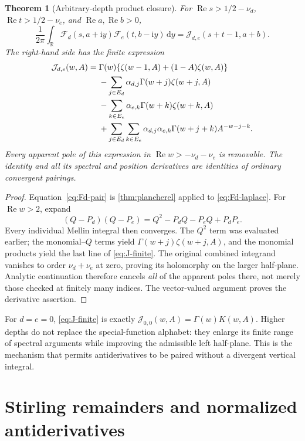 \documentclass[11pt,a4paper]{article}
\newtheorem{theorem}{Theorem}[section]
\theoremstyle{definition}
\numberwithin{equation}{section}
\newcommand{\R}{\mathbb R}
\newcommand{\Rea}{\operatorname{Re}}
\newcommand{\dd}{\,\mathrm d}
\newcommand{\ii}{\mathrm i}
\begin{document}
\begin{theorem}[Arbitrary-depth product closure]\label{thm:depth-closure}
For $\Rea s>1/2-\nu_d$, $\Rea t>1/2-\nu_e$, and
$\Rea a,\Rea b>0$,
\begin{equation}\label{eq:Fd-pair}
 \frac1{2\pi}\int_{\R}\mathcal F_d(s,a+\ii y)
                         \mathcal F_e(t,b-\ii y)\dd y
       =\mathcal J_{d,e}(s+t-1,a+b).
\end{equation}
The right-hand side has the finite expression
\begin{align}
 \mathcal J_{d,e}(w,A)={}&
 \Gamma(w)\{\zeta(w-1,A)+(1-A)\zeta(w,A)\}\notag\\
 &-\sum_{j\in E_d}\alpha_{d,j}\Gamma(w+j)\zeta(w+j,A)\notag\\
 &-\sum_{k\in E_e}\alpha_{e,k}\Gamma(w+k)\zeta(w+k,A)\notag\\
 &+\sum_{j\in E_d}\sum_{k\in E_e}
   \alpha_{d,j}\alpha_{e,k}\Gamma(w+j+k)A^{-w-j-k}.
                  \label{eq:J-finite}
\end{align}
Every apparent pole of this expression in
$\Rea w>-\nu_d-\nu_e$ is removable. The identity and all its spectral
and position derivatives are identities of ordinary convergent pairings.
\end{theorem}
\begin{proof}
Equation~\eqref{eq:Fd-pair} is \cref{thm:plancherel} applied to
\eqref{eq:Fd-laplace}. For $\Rea w>2$, expand
\[
 (Q-P_d)(Q-P_e)=Q^2-P_dQ-P_eQ+P_dP_e.
\]
Every individual Mellin integral then converges. The $Q^2$ term was
evaluated earlier; the monomial--$Q$ terms yield
$\Gamma(w+j)\zeta(w+j,A)$, and the monomial products yield the last
line of \eqref{eq:J-finite}. The original combined integrand vanishes
to order $\nu_d+\nu_e$ at zero, proving its holomorphy on the larger
half-plane. Analytic continuation therefore cancels \emph{all} of the
apparent poles there, not merely those checked at finitely many indices.
The vector-valued argument proves the derivative assertion.
\end{proof}

For $d=e=0$, \eqref{eq:J-finite} is exactly
$\mathcal J_{0,0}(w,A)=\Gamma(w)K(w,A)$. Higher depths do not replace the
special-function alphabet: they enlarge its finite range of spectral
arguments while improving the admissible left half-plane. This is the
mechanism that permits antiderivatives to be paired without a divergent
vertical integral.

\section{Stirling remainders and normalized antiderivatives}
\label{sec:primitives}
\end{document}
